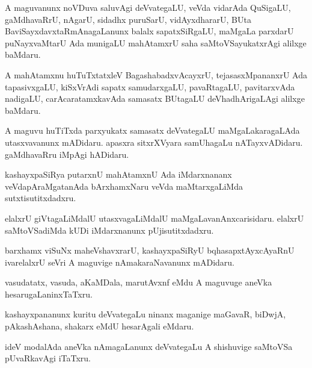 \documentclass{article}
\begin{document}
\begin{mn}
A maguvanunx noVDuva saluvAgi deVvategaLU, veVda vidarAda QuSigaLU, 
gaMdhavaRrU, nAgarU, sidadhx puruSarU, vidAyxdhararU, BUta 
BaviSayxdavxtaRmAnagaLanunx balalx sapatxSiRgaLU, maMgaLa parxdarU 
puNayxvaMtarU Ada munigaLU mahAtamxrU saha saMtoVSayukatxrAgi alilxge baMdaru.
\end{mn}

\begin{mn}
A mahAtamxnu huTuTxtatxleV BagashabadxvAcayxrU, tejasasxMpananxrU Ada 
tapasivxgaLU, kiSxVrAdi sapatx samudarxgaLU, pavaRtagaLU, pavitarxvAda 
nadigaLU, carAcaratamxkavAda samasatx BUtagaLU deVhadhArigaLAgi alilxge baMdaru.
\end{mn}

\begin{mn}
A maguvu huTiTxda parxyukatx samasatx deVvategaLU maMgaLakaragaLAda 
utasxvavanunx mADidaru. apasxra sitxrXVyara samUhagaLu nATayxvADidaru. 
gaMdhavaRru iMpAgi hADidaru.
\end{mn}

\begin{mn}
kashayxpaSiRya putarxnU mahAtamxnU Ada iMdarxnananx veVdapAraMgatanAda
bArxhamxNaru veVda maMtarxgaLiMda sutxtisutitxdadxru. 
\end{mn}

\begin{mn}
elalxrU giVtagaLiMdalU utasxvagaLiMdalU maMgaLavanAnxcarisidaru.  elalxrU 
saMtoVSadiMda kUDi iMdarxnanunx pUjisutitxdadxru.
\end{mn}

\begin{mn}
barxhamx  viSuNx  maheVshavxrarU, kashayxpaSiRyU bqhasapxtAyxcAyaRnU ivarelalxrU
seVri A maguvige nAmakaraNavanunx mADidaru. 
\end{mn}

\begin{mn}
vasudatatx, vasuda, aKaMDala, marutAvxnf eMdu A maguvuge aneVka 
hesarugaLaninxTaTxru.
\end{mn}

\begin{mn}
kashayxpananunx kuritu deVvategaLu ninanx maganige maGavaR, biDwjA, 
pAkashAshana, shakarx eMdU hesarAgali eMdaru.
\end{mn}

\begin{mn}
ideV modalAda aneVka nAmagaLanunx deVvategaLu A shishuvige saMtoVSa 
pUvaRkavAgi iTaTxru.
\end{mn}
\end{document}
